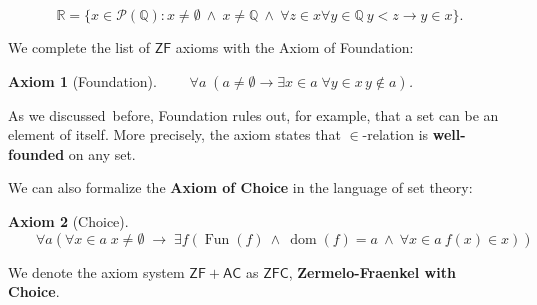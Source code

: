 \documentclass{article}
\newcommand{\ZF}{\mathsf{ZF}}
\newcommand{\Op}[1]{\operatorname{#1}}
\newcommand{\Rat}{\mathbb{Q}}
\newcommand{\Real}{\mathbb{R}}
\newcommand{\AC}{\mathsf{AC}}
\newcommand{\ZFC}{\mathsf{ZFC}}
\newtheorem{axiom}{Axiom}[section]
\begin{document}
\begin{equation}
\Real = \{ x \in \mathcal{P}(\Rat) \colon x \neq \emptyset \: \wedge \: x \neq \Rat \: \wedge \: \forall z \in x \forall y \in \Rat \: y < z \to y \in x \}.
\end{equation}

We complete the list of $\ZF$ axioms with the Axiom of Foundation:

\begin{axiom}[Foundation]$\qquad \forall a \;( a \neq \emptyset \to \exists x \in a \; \forall y \in x \, y \not \in a)$.

\end{axiom}As we discussed~before, Foundation rules out, for example, that a set can be an element of itself. More precisely, the axiom states that $\in$-relation is \textbf{well-founded} on any set.

We can also formalize the \textbf{Axiom of Choice} in the language of set theory:

\begin{axiom}[Choice]$\qquad \forall a ( \forall x \in a \; x \neq \emptyset \; \to \; \exists f (\Op{Fun}(f) \:\wedge\: \Op{dom}(f) = a \:\wedge\: \forall x \in a \: f(x) \in x))$

\end{axiom}We denote the axiom system $\ZF + \AC$ as $\ZFC$, \textbf{Zermelo-Fraenkel with Choice}.

\clearpage

\end{document}
